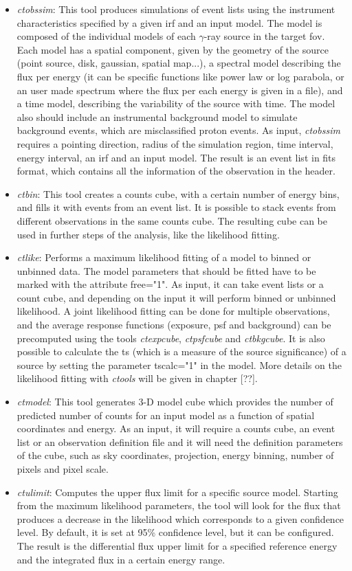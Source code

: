 \documentclass[main.tex]{subfiles}
\begin{document}
\begin{itemize}
\item \textit{ctobssim}: This tool produces simulations of event lists using the instrument characteristics specified by a given \gls{irf} and an input model. The model is composed of the individual models of each $\gamma$-ray source in the target \gls{fov}. Each model has a spatial component, given by the geometry of the source (point source, disk, gaussian, spatial map...), a spectral model describing the flux per energy (it can be specific functions like power law or log parabola, or an user made spectrum where the flux per each energy is given in a file), and a time model, describing the variability of the source with time. The model also should include an instrumental background model to simulate background events, which are misclassified proton events.
  As input, \textit{ctobssim} requires a pointing direction, radius of the simulation region, time interval, energy interval, an \gls{irf} and an input model. The result is an event list in fits format, which contains all the information of the observation in the header.
\item \textit{ctbin}: This tool creates a counts cube, with a certain number of energy bins, and fills it with events from an event list. It is possible to stack events from different observations in the same counts cube. The resulting cube can be used in further steps of the analysis, like the likelihood fitting.
\item \textit{ctlike}: Performs a maximum likelihood fitting of a model to binned or unbinned data. The model parameters that should be fitted have to be marked with the attribute free="1". As input, it can take event lists or a count cube, and depending on the input it will perform binned or unbinned likelihood. A joint likelihood fitting can be done for multiple observations, and the average response functions (exposure, \gls{psf} and background) can be precomputed using the tools \textit{ctexpcube}, \textit{ctpsfcube} and \textit{ctbkgcube}. It is also possible to calculate the \gls{ts} (which is a measure of the source significance) of a source by setting the parameter tscalc="1" in the model. More details on the likelihood fitting with \textit{ctools} will be given in chapter [??].
\item \textit{ctmodel}: This tool generates 3-D model cube which provides the number of predicted number of counts for an input model as a function of spatial coordinates and energy. As an input, it will require a counts cube, an event list or an observation definition file and it will need the definition parameters of the cube, such as sky coordinates, projection, energy binning, number of pixels and pixel scale.
\item \textit{ctulimit}: Computes the upper flux limit for a specific source model. Starting from the maximum likelihood parameters, the tool will look for the flux that produces a decrease in the likelihood which corresponds to a given confidence level. By default, it is set at 95\% confidence level, but it can be configured. The result is the differential flux upper limit for a specified reference energy and the integrated flux in a certain energy range.
  
\end{itemize}
\end{document}
